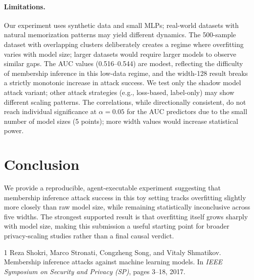 \documentclass[11pt,a4paper]{article}
\begin{document}
\paragraph{Limitations.}
Our experiment uses synthetic data and small MLPs; real-world datasets
with natural memorization patterns may yield different dynamics.
The 500-sample dataset with overlapping clusters deliberately creates
a regime where overfitting varies with model size; larger datasets
would require larger models to observe similar gaps. The AUC values
(0.516--0.544) are modest, reflecting the difficulty of membership
inference in this low-data regime, and the width-128 result breaks a
strictly monotonic increase in attack success. We test only the shadow
model attack variant; other attack strategies (e.g., loss-based,
label-only) may show different scaling patterns. The correlations,
while directionally consistent, do not reach individual significance
at $\alpha = 0.05$ for the AUC predictors due to the small number of
model sizes (5 points); more width values would increase statistical power.

\section{Conclusion}

We provide a reproducible, agent-executable experiment suggesting that
membership inference attack success in this toy setting tracks
overfitting slightly more closely than raw model size, while remaining
statistically inconclusive across five widths. The strongest supported
result is that overfitting itself grows sharply with model size, making
this submission a useful starting point for broader privacy-scaling
studies rather than a final causal verdict.


\begin{thebibliography}{1}
Reza Shokri, Marco Stronati, Congzheng Song, and Vitaly Shmatikov.
\newblock Membership inference attacks against machine learning models.
\newblock In \emph{IEEE Symposium on Security and Privacy (SP)}, pages
  3--18, 2017.
\end{thebibliography}
\end{document}
